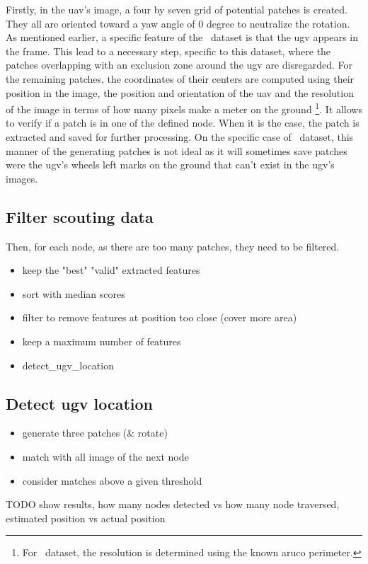 Firstly, in the \gls{uav}'s image, a four by seven grid of potential patches is created.
They all are oriented toward a yaw angle of 0 degree to neutralize the rotation.
As mentioned earlier, a specific feature of the~\cite{fortin_uav-assisted_2024} dataset is that the \gls{ugv} appears in the frame.
This lead to a necessary step, specific to this dataset, where the patches overlapping with an exclusion zone around the
\gls{ugv} are disregarded.
For the remaining patches, the coordinates of their centers are computed using their position in the image, the position
and orientation of the \gls{uav} and the resolution of the image in terms of how many pixels make a meter on the ground
\footnote{For~\cite{fortin_uav-assisted_2024} dataset, the resolution is determined using the known aruco perimeter.}.
It allows to verify if a patch is in one of the defined node.
When it is the case, the patch is extracted and saved for further processing.
On the specific case of~\cite{fortin_uav-assisted_2024} dataset, this manner of the generating patches is not ideal as it
will sometimes save patches were the \gls{ugv}'s wheels left marks on the ground that can't exist in the \gls{ugv}'s images.

\subsection{Filter scouting data}

Then, for each node, as there are too many patches, they need to be filtered.


\begin{itemize}
    \item keep the "best" "valid" extracted features
    \item sort with median scores
    \item filter to remove features at position too close (cover more area)
    \item keep a maximum number of features
    \item detect\_ugv\_location
\end{itemize}

\subsection{Detect \gls{ugv} location}

\begin{itemize}
    \item generate three patches (\& rotate)
    \item match with all image of the next node
    \item consider matches above a given threshold
\end{itemize}

TODO show results, how many nodes detected vs how many node traversed, estimated position vs actual position
